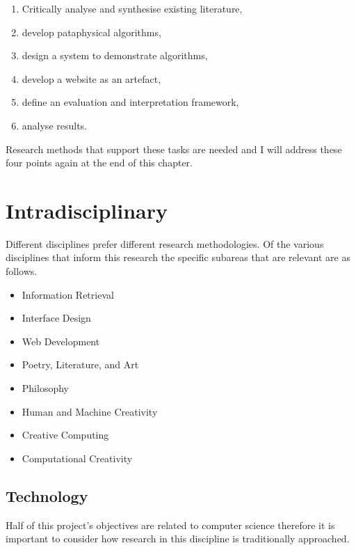 \label{s:objectives}
\begin{enumerate}
  \item Critically analyse and synthesise existing literature,\sidepar{\textspiral~\ref{p:lit}}
  \item develop pataphysical algorithms,\sidepar{\textspiral~\ref{p:practice}}
  \item design a system to demonstrate algorithms,\sidepar{\textspiral~\ref{p:practice}}
  \item develop a website as an artefact,\sidepar{\textspiral~\ref{p:practice}}
  \item define an evaluation and interpretation framework,\sidepar{\textspiral~\ref{p:theory}}
  \item analyse results.\sidepar{\textspiral~\ref{p:analysis}}
\end{enumerate}

Research methods that support these tasks are needed and I will address these four points again at the end of this chapter.


\section{Intradisciplinary}

Different disciplines prefer different research methodologies. Of the various disciplines that inform this research the specific subareas that are relevant are as follows.

\begin{itemize}
  \item Information Retrieval
  \item Interface Design
  \item Web Development
  \item Poetry, Literature, and Art
  \item Philosophy
  \item Human and Machine Creativity
  \item Creative Computing
  \item Computational Creativity
\end{itemize}


\subsection{Technology}

Half of this project's objectives are related to computer science therefore it is important to consider how research in this discipline is traditionally approached.

